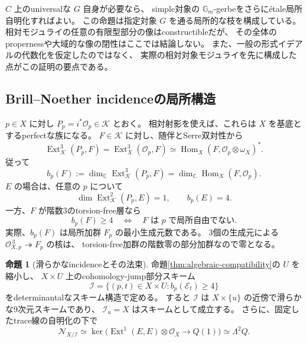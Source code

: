 \documentclass[a4paper,11pt]{ltjsarticle}
\theoremstyle{definition}
\newtheorem{theorem}{命題}[section]
\newcommand{\CC}{\mathbb C}
\newcommand{\OO}{\mathcal O}
\newcommand{\Ext}{\operatorname{Ext}}
\begin{document}
$C$ 上のuniversalな $G$ 自身が必要なら、
simple対象の $\mathbb G_m$-gerbeをさらに\'etale局所自明化すればよい。
この命題は指定対象 $G$ を通る局所的な枝を構成している。
相対モジュライの任意の有限型部分の像はconstructibleだが、
その全体のpropernessや大域的な像の閉性はここでは結論しない。
また、一般の形式イデアルの代数化を仮定したのではなく、
実際の相対対象モジュライを先に構成した点がこの証明の要点である。

\subsection{Brill--Noether incidenceの局所構造}

$p\in X$ に対し $P_p=i^*\OO_p\in\mathcal K$ とおく。
相対射影を使えば、これらは $X$ を基底とするperfectな族になる。
$F\in\mathcal K$ に対し、随伴とSerre双対性から
\[
 \Ext^3_{\mathcal K}(P_p,F)=\Ext^3_X(\OO_p,F)
 \simeq\operatorname{Hom}_X(F,\OO_p\otimes\omega_X)^*.
\]
従って
\[
 b_p(F):=\dim_\CC\Ext^3_{\mathcal K}(P_p,F)
       =\dim_\CC\operatorname{Hom}_X(F,\OO_p).
\]
$E$ の場合は、任意の $p$ について
\[
 \dim\Ext^2_{\mathcal K}(P_p,E)=1,\qquad b_p(E)=4.
\]
一方、$F$ が階数3のtorsion-free層なら
\[
 b_p(F)\ge4
 \quad\Longleftrightarrow\quad
 F\text{ は }p\text{ で局所自由でない}.
 \tag{BN}\label{eq:bn-nonfree}
\]
実際、$b_p(F)$ は局所加群 $F_p$ の最小生成元数である。
3個の生成元による $\OO_{X,p}^{\,3}\twoheadrightarrow F_p$ の核は、
torsion-free加群の階数零の部分加群なので零となる。

\begin{theorem}[滑らかなincidenceとその法束]\label{thm:bn-incidence}
命題\ref{thm:algebraic-compatibility}の $U$ を縮小し、
$X\times U$ 上のcohomology-jump部分スキーム
\[
 \mathcal I
   =\{(p,t)\in X\times U:b_p(\mathcal E_t)\ge4\}
\]
をdeterminantalなスキーム構造で定める。
すると $\mathcal I$ は $X\times\{u\}$ の近傍で滑らかな9次元スキームであり、
$\mathcal I_u=X$ はスキームとして成立する。
さらに、固定したtrace線の自明化の下で
\[
 \mathcal N_{X/\mathcal I}
 \simeq
 \ker\bigl(\Ext^1(E,E)\otimes\OO_X\longrightarrow Q(1)\bigr)
 \simeq\Lambda^2Q.
\]
\end{theorem}
\end{document}
